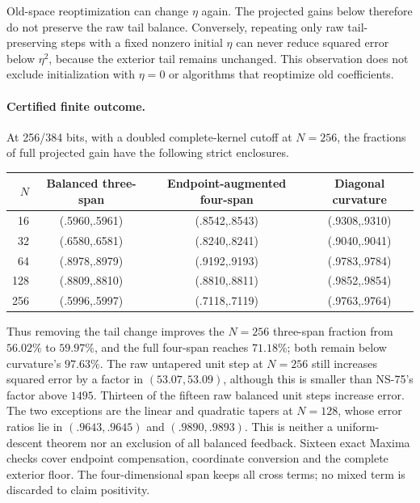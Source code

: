 Old-space reoptimization can change $\eta$ again. The projected gains
below therefore do not preserve the raw tail balance. Conversely,
repeating only raw tail-preserving steps with a fixed nonzero initial
$\eta$ can never reduce squared error below $\eta^2$, because the
exterior tail remains unchanged. This observation does not exclude
initialization with $\eta=0$ or algorithms that reoptimize old coefficients.

\paragraph{Certified finite outcome.}
At 256/384 bits, with a doubled complete-kernel cutoff at $N=256$,
the fractions of full projected gain have the following strict enclosures.
\begin{center}
\begin{tabular}{rccc}
\hline
$N$&Balanced three-span&Endpoint-augmented four-span&Diagonal curvature\\
\hline
16&(.5960,.5961)&(.8542,.8543)&(.9308,.9310)\\
32&(.6580,.6581)&(.8240,.8241)&(.9040,.9041)\\
64&(.8978,.8979)&(.9192,.9193)&(.9783,.9784)\\
128&(.8809,.8810)&(.8810,.8811)&(.9852,.9854)\\
256&(.5996,.5997)&(.7118,.7119)&(.9763,.9764)\\
\hline
\end{tabular}
\end{center}
Thus removing the tail change improves the $N=256$ three-span fraction
from $56.02\%$ to $59.97\%$, and the full four-span reaches $71.18\%$;
both remain below curvature's $97.63\%$. The raw untapered unit step
at $N=256$ still increases squared error by a factor in $(53.07,53.09)$,
although this is smaller than NS-75's factor above $1495$.
Thirteen of the fifteen raw balanced unit steps increase error. The two
exceptions are the linear and quadratic tapers at $N=128$, whose error
ratios lie in $(.9643,.9645)$ and $(.9890,.9893)$. This is neither a
uniform-descent theorem nor an exclusion of all balanced feedback.
Sixteen exact Maxima checks cover endpoint compensation, coordinate
conversion and the complete exterior floor. The four-dimensional span
keeps all cross terms; no mixed term is discarded to claim positivity.
